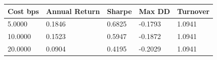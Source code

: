\begin{tabular}{lllll}
\toprule
Cost bps & Annual Return & Sharpe & Max DD & Turnover \\
\midrule
5.0000 & 0.1846 & 0.6825 & -0.1793 & 1.0941 \\
10.0000 & 0.1523 & 0.5947 & -0.1872 & 1.0941 \\
20.0000 & 0.0904 & 0.4195 & -0.2029 & 1.0941 \\
\bottomrule
\end{tabular}

